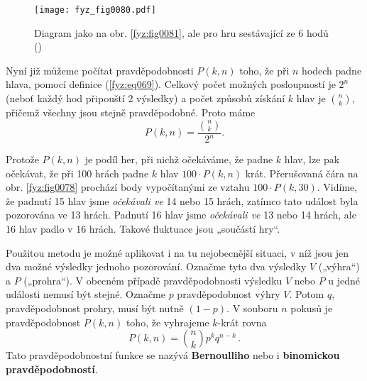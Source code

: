    \begin{figure}[ht!]  %
      \centering
      \texttt{[image: fyz\_fig0080.pdf]}
      \caption{Diagram jako na obr. \ref{fyz:fig0081}, ale pro hru sestávající ze \num{6} hodů
               (\cite[s.~82]{Feynman01})}
      \label{fyz:fig0080}
    \end{figure}
    
    Nyní již můžeme počítat pravděpodobnosti \(P(k, n)\) toho, že při \(n\) hodech padne hlava,
    pomocí definice (\ref{fyz:eq069}). Celkový počet možných posloupností je \(2^n\) (neboť každý
    hod připouští 2 výsledky) a počet způsobů získání \(k\) hlav je \(\binom{n}{k}\), přičemž
    všechny jsou stejně pravděpodobné. Proto máme
    \begin{equation}\label{fyz:eq075}
      P(k,n) = 
      \frac{\binom{n}{k}}{2^n}.
    \end{equation}
    
    Protože \(P(k, n)\) je podíl her, při nichž očekáváme, že padne \(k\) hlav, lze pak očekávat, 
    že při \num{100} hrách padne \(k\) hlav \(100\cdot P(k, n)\) krát. Přerušovaná čára na obr. 
    \ref{fyz:fig0078} prochází body vypočítanými ze vztahu \(100\cdot P(k, 30)\). Vidíme, že padnutí 
    \num{15} hlav jsme \emph{očekávali ve} \num{14} nebo \num{15} hrách, zatímco tato událost byla 
    pozorována ve \num{13} hrách. Padnutí \num{16} hlav jsme \emph{očekávali ve} \num{13} nebo 
    \num{14} hrách, ale \num{16} hlav padlo v \num{16} hrách. Takové fluktuace jsou „součástí hry“.
    
    Použitou metodu je možné aplikovat i na tu nejobecnější situaci, v níž jsou jen dva možné 
    výsledky jednoho pozorování. Označme tyto dva výsledky \(V\) („výhra“) a \(P\) („prohra“). V 
    obecném případě pravděpodobnosti výsledku \(V\) nebo \(P\) u jedné události nemusí být stejné. 
    Označme \(p\) pravděpodobnost výhry \(V\). Potom \(q\), pravděpodobnost prohry, musí být nutně 
    \((1 - p)\). V souboru \(n\) pokusů je pravděpodobnost \(P(k, n)\) toho, že vyhrajeme 
    \(k\)-krát rovna
    \begin{equation}\label{fyz:eq076}
      \boxed{P(k,n) = \binom{n}{k}p^kq^{n-k}}\,.
    \end{equation}
    Tato pravděpodobnostní funkce se nazývá \textbf{Bernoulliho} nebo i \textbf{binomickou 
    pravděpodobností}.
    
